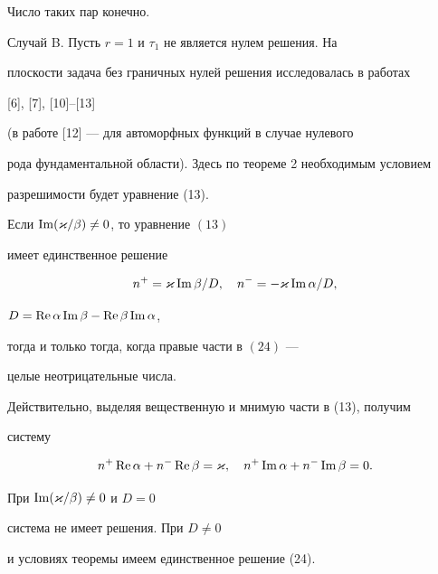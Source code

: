 Число таких пар конечно.


\medskip





Случай B. Пусть $r=1$ и $\tau_1$ не является нулем решения. На


плоскости задача без граничных нулей решения исследовалась в работах


[6], [7], [10]--[13]


(в работе [12] --- для автоморфных функций в случае нулевого


рода фундаментальной области). Здесь по теореме 2 необходимым условием


разрешимости будет уравнение (13).





\begin{lem}


Если $\operatorname{Im} (\varkappa/\beta)\ne 0$, то уравнение $(13)$


имеет единственное решение


\begin{equation}


n^+ =\varkappa\im\beta/D,\quad n^- = -\varkappa\im\alpha/D,


\end{equation}


$D=\operatorname{Re}\alpha \operatorname{Im}\beta - \operatorname{Re}\beta \operatorname{Im}\alpha$,


тогда и только тогда, когда правые части в $(24)$ ---


целые неотрицательные числа.


\end{lem}





Действительно, выделяя вещественную и мнимую части в (13), получим


систему


\begin{equation}


n^+ \re\alpha + n^- \re\beta = \varkappa,\quad


n^+ \im\alpha +n^- \im \beta =0.


\end{equation}


При $\operatorname{Im}(\varkappa/\beta)\ne 0$ и $D=0$


система не имеет решения. При $D\ne 0$


и условиях теоремы имеем единственное решение (24).





